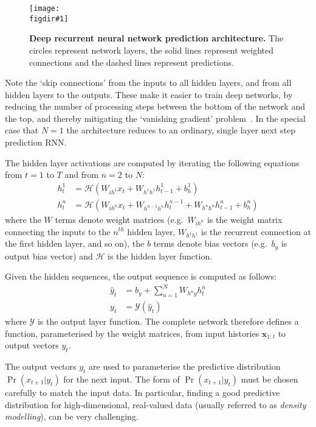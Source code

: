 \documentclass{article}
\newcommand{\eg}{e.g.\ }
\newcommand{\flabel}[1]{\label{fig:#1}}
\newcommand{\hiddenfn}{\mathcal{H}}
\newcommand{\outputfn}{\mathcal{Y}}
\newcommand{\bias}[1]{b_{#1}}
\newcommand{\hbias}{\bias{h}}
\newcommand{\obias}{\bias{y}}
\newcommand{\seq}[1]{\mathbf{#1}}
\newcommand{\invble}{x}
\newcommand{\inseq}{\seq{\invble}}
\newcommand{\figdir}{}
\newcommand{\capt}[2]{\caption[#1]{\textbf{#1}#2}}
\newcommand{\fig}[5]
{
\begin{figure}
\begin{center}
\texttt{[image: \\figdir\#1]}
\end{center}
\capt{#4}{#5}
\flabel{#2}
\end{figure}
}
\begin{document}
\fig{deep_predictor}{deep_predictor}{0.925}{Deep recurrent neural network prediction architecture.}{ The circles represent network layers, the solid lines represent weighted connections and the dashed lines represent predictions.}

Note the `skip connections' from the inputs to all hidden layers, and from all hidden layers to the outputs.
These make it easier to train deep networks, by reducing the number of processing steps between the bottom of the network and the top, and thereby mitigating the `vanishing gradient' problem~\cite{bengio94learning}.
In the special case that $N=1$ the architecture reduces to an ordinary, single layer next step prediction RNN.

The hidden layer activations are computed by iterating the following equations from $t=1$ to $T$ and from $n=2$ to $N$:
\begin{align}
\label{eq:pred_hidden}
h^1_t &= \hiddenfn\left(W_{i h^1} x_t + W_{h^{1}h^{1}} h^1_{t-1} + \hbias^1 \right)\\
h^n_t &= \hiddenfn\left(W_{i h^n} x_t + W_{h^{n-1}h^{n}} h^{n-1}_t + W_{h^{n}h^{n}} h^n_{t-1} + \hbias^n \right)
\end{align} 
where the $W$ terms denote weight matrices (\eg $W_{i h^n}$ is the weight matrix connecting the inputs to the $n^{th}$ hidden layer, $W_{h^{1}h^{1}}$ is the recurrent connection at the first hidden layer, and so on), the $b$ terms denote bias vectors (\eg $\obias$ is output bias vector) and $\hiddenfn$ is the hidden layer function. 

Given the hidden sequences, the output sequence is computed as follows:
\begin{align}
\label{eq:pred_output}
\hat{y}_t &= \obias + \sum_{n=1}^N{W_{h^n y} h^n_t}\\
y_t &= \outputfn(\hat{y}_t)	
\end{align}
where $\outputfn$ is the output layer function.
The complete network therefore defines a function, parameterised by the weight matrices, from input histories $\inseq_{1:t}$ to output vectors $y_t$.

The output vectors $y_t$ are used to parameterise the predictive distribution $\Pr(x_{t+1}|y_t)$ for the next input.
The form of $\Pr(x_{t+1}|y_t)$ must be chosen carefully to match the input data.
In particular, finding a good predictive distribution for high-dimensional, real-valued data (usually referred to as \emph{density modelling}), can be very challenging.
\end{document}
